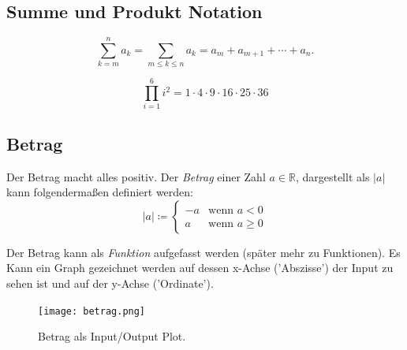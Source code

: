 %     

\subsection{Summe und Produkt Notation}

\begin{equation}
{\displaystyle \sum _{k=m}^{n}a_{k}=\sum _{m\leq k\leq n}a_{k}=a_{m}+a_{m+1}+\dotsb +a_{n}.}
\end{equation}



\begin{equation}
{\displaystyle \prod _{i=1}^{6}i^{2} =  1\cdot 4\cdot 9\cdot 16\cdot 25\cdot 36}
\end{equation}


\subsection{Betrag}


Der Betrag macht alles positiv. Der \emph{Betrag} einer Zahl $a \in \mathbb{R}$, dargestellt als $|a|$ kann folgendermaßen definiert werden:
$$ 
|a| \coloneqq
\begin{cases} 
-a & \text{wenn } a < 0 \\ 
a & \text{wenn } a \geq 0 
\end{cases}
$$ 

Der Betrag kann als \emph{Funktion} aufgefasst werden (später mehr zu Funktionen). Es Kann ein Graph gezeichnet werden auf dessen x-Achse ('Abszisse') der Input zu sehen ist und auf der y-Achse ('Ordinate'). 



\begin{figure}[h!]
    \centering
    \texttt{[image: betrag.png]}
    \caption{Betrag als Input/Output Plot.}
    \label{fig:betrag}
\end{figure}

